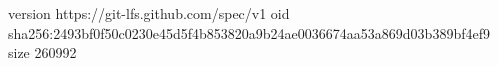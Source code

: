 version https://git-lfs.github.com/spec/v1
oid sha256:2493bf0f50c0230e45d5f4b853820a9b24ae0036674aa53a869d03b389bf4ef9
size 260992
